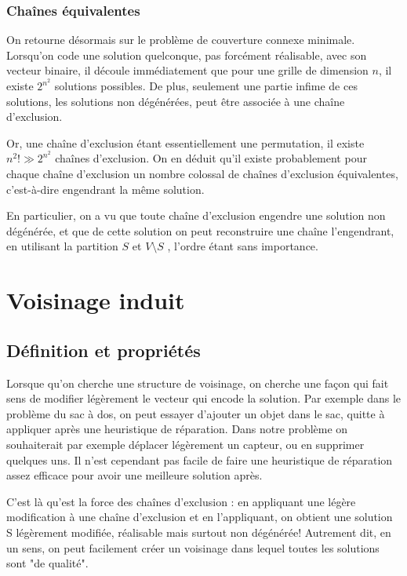 \documentclass[12pt,a4paper]{article}
\begin{document}
\subsubsection{Chaînes équivalentes}
On retourne désormais sur le problème de couverture connexe minimale.
\\Lorsqu'on code une solution quelconque, pas forcément réalisable, avec son vecteur binaire, il découle immédiatement que pour une grille de dimension $n$, il existe $2^{n^2}$ solutions possibles. De plus, seulement une partie infime de ces solutions, les solutions non dégénérées, peut être associée à une chaîne d'exclusion.

Or, une chaîne d'exclusion étant essentiellement une permutation, il existe $n^2!\gg 2^{n^2}$ chaînes d'exclusion. On en déduit qu'il existe probablement pour chaque chaîne d'exclusion un nombre colossal de chaînes d'exclusion équivalentes, c'est-à-dire engendrant la même solution.

En particulier, on a vu que toute chaîne d'exclusion engendre une solution non dégénérée, et que de cette solution on peut reconstruire une chaîne l'engendrant, en utilisant la partition $S$ et $V\setminus S$ , l'ordre étant sans importance.


\section{Voisinage induit}
\subsection{Définition et propriétés}
Lorsque qu'on cherche une structure de voisinage, on cherche une façon qui fait sens de modifier légèrement le vecteur qui encode la solution. Par exemple dans le problème du sac à dos, on peut essayer d'ajouter un objet dans le sac, quitte à appliquer après une heuristique de réparation. Dans notre problème on souhaiterait par exemple déplacer légèrement un capteur, ou en supprimer quelques uns. Il n'est cependant pas facile de faire une heuristique de réparation assez efficace pour avoir une meilleure solution après.

C'est là qu'est la force des chaînes d'exclusion : en appliquant une légère modification à une chaîne d'exclusion et en l'appliquant, on obtient une solution S légèrement modifiée, réalisable mais surtout non dégénérée! Autrement dit, en un sens, on peut facilement créer un voisinage dans lequel toutes les solutions sont "de qualité".
\end{document}
